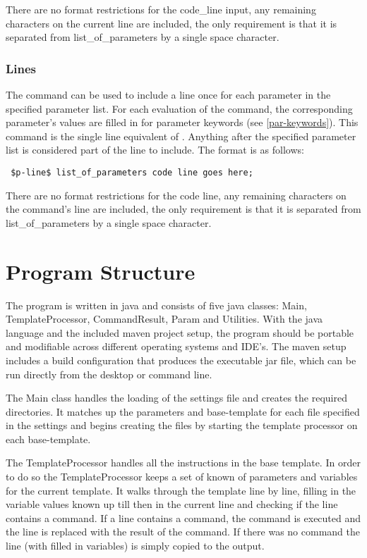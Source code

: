 \documentclass{settings/TU_Delft_Report}
\begin{document}
There are no format restrictions for the code\_line input, any remaining characters on the current line are included, the only requirement is that it is separated from list\_of\_parameters by a single space character.

\subsection{Lines} \label{p-line}
The  command can be used to include a line once for each parameter in the specified parameter list. For each evaluation of the command, the corresponding parameter's values are filled in for parameter keywords (see \ref{par-keywords}). This command is the single line equivalent of . Anything after the specified parameter list is considered part of the line to include. The format is as follows:
\begin{lstlisting}
 $p-line$ list_of_parameters code line goes here;
\end{lstlisting}

There are no format restrictions for the code line, any remaining characters on the command's line are included, the only requirement is that it is separated from list\_of\_parameters by a single space character.

\chapter{Program Structure}
The program is written in java and consists of five java classes: Main, TemplateProcessor, CommandResult, Param and Utilities. With the java language and the included maven project setup, the program should be portable and modifiable across different operating systems and IDE's. The maven setup includes a build configuration that produces the executable jar file, which can be run directly from the desktop or command line.

\vsp The Main class handles the loading of the settings file and creates the required directories. It matches up the parameters and base-template for each file specified in the settings and begins creating the files by starting the template processor on each base-template.

\vsp The TemplateProcessor handles all the instructions in the base template. In order to do so the TemplateProcessor keeps a set of known of parameters and variables for the current template. It walks through the template line by line, filling in the variable values known up till then in the current line and checking if the line contains a command. If a line contains a command, the command is executed and the line is replaced with the result of the command. If there was no command the line (with filled in variables) is simply copied to the output.
\end{document}
